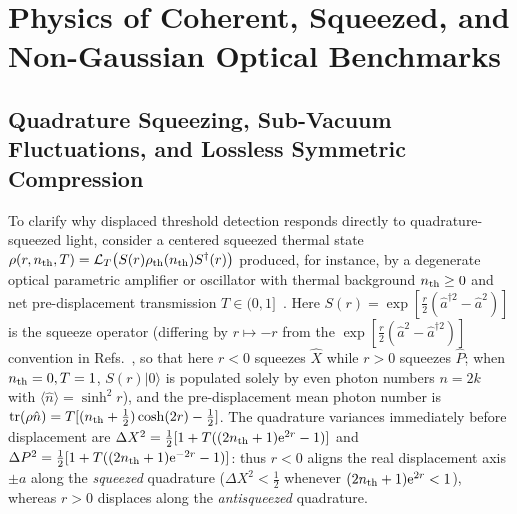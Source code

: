 \documentclass{iopjournal}
\newcommand{\tr}{\operatorname{tr}}
\newcommand{\ket}[1]{\lvert #1\rangle}
\newcommand{\ee}{\mathrm{e}}
\newcommand{\calL}{\mathcal{L}}
\begin{document}
\section{Physics of Coherent, Squeezed, and Non-Gaussian Optical Benchmarks}\label{sec:benchmarks}

\subsection{Quadrature Squeezing, Sub-Vacuum Fluctuations, and Lossless Symmetric Compression}\label{subsec:sq-thermal}

To clarify why displaced threshold detection responds directly to quadrature-squeezed light, consider a centered squeezed thermal state $\rho(r, n_{\rm th}, T) = \calL_T\bigl(S(r)\rho_{\rm th}(n_{\rm th})S^\dagger(r)\bigr)$ produced, for instance, by a degenerate optical parametric amplifier or oscillator with thermal background $n_{\rm th} \ge 0$ and net pre-displacement transmission $T \in (0,1]$~\cite{ScullyZubairy1997,Loudon2000,GerryKnight2005}. Here $S(r) = \exp[\frac{r}{2}(\hat a^{\dagger 2} - \hat a^2)]$ is the squeeze operator (differing by $r \mapsto -r$ from the $\exp[\frac{r}{2}(\hat a^2 - \hat a^{\dagger 2})]$ convention in Refs.~\cite{ScullyZubairy1997,Loudon2000,GerryKnight2005}, so that here $r < 0$ squeezes $\hat X$ while $r > 0$ squeezes $\hat P$; when $n_{\rm th} = 0, T = 1$, $S(r)\ket{0}$ is populated solely by even photon numbers $n = 2k$ with $\langle\hat n\rangle = \sinh^2 r$), and the pre-displacement mean photon number is $\tr(\rho\hat n) = T[(n_{\rm th} + \frac{1}{2})\cosh(2r) - \frac{1}{2}]$. The quadrature variances immediately before displacement are $\Delta X^2 = \frac{1}{2}[1 + T((2n_{\rm th}+1)\ee^{2r}-1)]$ and $\Delta P^2 = \frac{1}{2}[1 + T((2n_{\rm th}+1)\ee^{-2r}-1)]$: thus $r < 0$ aligns the real displacement axis $\pm a$ along the \emph{squeezed} quadrature ($\Delta X^2 < \frac{1}{2}$ whenever $(2n_{\rm th}+1)\ee^{2r} < 1$), whereas $r > 0$ displaces along the \emph{antisqueezed} quadrature.
\end{document}
